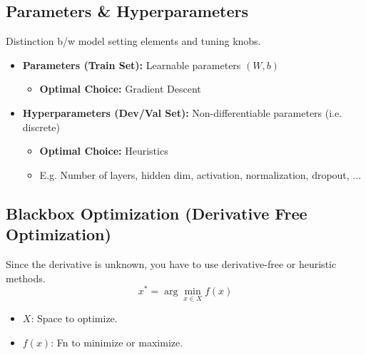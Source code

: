 \subsection{Parameters \& Hyperparameters}
\begin{definition}
    Distinction b/w model setting elements and tuning knobs.
    \begin{itemize}
        \item \textbf{Parameters (Train Set):} Learnable parameters $(W,b)$
        \begin{itemize}
            \item \textbf{Optimal Choice:} Gradient Descent
        \end{itemize}
        \item \textbf{Hyperparameters (Dev/Val Set):} Non-differentiable parameters (i.e. discrete)
        \begin{itemize}
            \item \textbf{Optimal Choice:} Heuristics
            \item E.g. Number of layers, hidden dim, activation, normalization, dropout, ...
        \end{itemize}
    \end{itemize}
\end{definition}
\newpage

\subsection{Blackbox Optimization (Derivative Free Optimization)}
\begin{motivation}
    Since the derivative is unknown, you have to use derivative-free or heuristic methods. 
    \begin{equation*}
        x^* = \arg\min_{x \in X} f(x)
    \end{equation*}
    \begin{itemize}
        \item $X$: Space to optimize.
        \item $f(x)$: Fn to minimize or maximize.
    \end{itemize}
\end{motivation}

